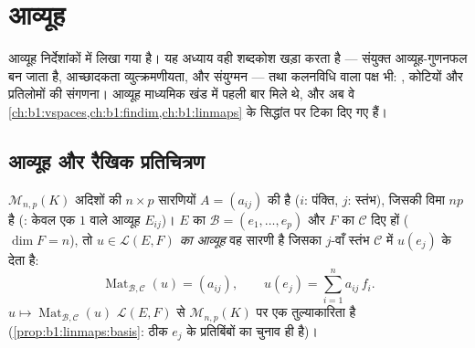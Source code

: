 \chapter{आव्यूह}\label{ch:b1:matrices}

आव्यूह निर्देशांकों में लिखा गया  है। यह अध्याय वही शब्दकोश
खड़ा करता है --- संयुक्त  आव्यूह-गुणनफल बन जाता है, 
आच्छादकता व्युत्क्रमणीयता, और  संयुग्मन --- तथा कलनविधि वाला
पक्ष भी: , कोटियों और प्रतिलोमों की संगणना। आव्यूह माध्यमिक
खंड में पहली बार मिले थे, और अब वे
\cref{ch:b1:vspaces,ch:b1:findim,ch:b1:linmaps} के सिद्धांत पर टिका दिए गए
हैं।

\section{आव्यूह और रैखिक प्रतिचित्रण}

\begin{definition}\label{def:b1:matrices:def}
$\mathcal{M}_{n,p}(K)$ अदिशों की $n \times p$ सारणियों $A = (a_{ij})$ की
 है ($i$: पंक्ति, $j$: स्तंभ), जिसकी विमा $np$ है (: केवल एक
$1$ वाले आव्यूह $E_{ij}$)। $E$ का  $\mathcal{B} = (e_1, \dots, e_p)$ और
$F$ का  $\mathcal{C}$ दिए हों ($\dim F = n$), तो \emph{$u \in
\mathcal{L}(E, F)$ का आव्यूह} वह सारणी है जिसका $j$-वाँ स्तंभ $\mathcal{C}$
में $u(e_j)$ के  देता है:
\[
\operatorname{Mat}_{\mathcal{B},\mathcal{C}}(u) = (a_{ij}),
\qquad u(e_j) = \sum_{i=1}^{n} a_{ij}\, f_i .
\]
 $u \mapsto \operatorname{Mat}_{\mathcal{B},\mathcal{C}}(u)$
$\mathcal{L}(E, F)$ से $\mathcal{M}_{n,p}(K)$ पर एक तुल्याकारिता है
(\cref{prop:b1:linmaps:basis}:  ठीक $e_j$ के प्रतिबिंबों का
चुनाव ही है)।
\end{definition}

